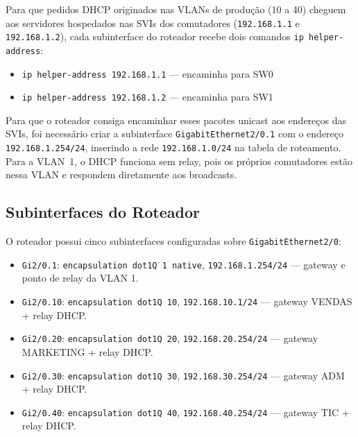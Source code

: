 Para que pedidos DHCP originados nas VLANs de produção (10 a 40) cheguem aos
servidores hospedados nas SVIs dos comutadores (\texttt{192.168.1.1} e
\texttt{192.168.1.2}), cada subinterface do roteador recebe dois comandos
\texttt{ip helper-address}:

\begin{itemize}[leftmargin=2em]
  \item \texttt{ip helper-address 192.168.1.1} --- encaminha para SW0
  \item \texttt{ip helper-address 192.168.1.2} --- encaminha para SW1
\end{itemize}

\begin{sloppypar}
Para que o roteador consiga encaminhar esses pacotes unicast aos endereços das SVIs,
foi necessário criar a subinterface \texttt{GigabitEthernet2/0.1} com o endereço
\texttt{192.168.1.254/24}, inserindo a rede \texttt{192.168.1.0/24} na tabela de
roteamento. Para a VLAN~1, o DHCP funciona sem relay, pois os próprios comutadores
estão nessa VLAN e respondem diretamente aos broadcasts.
\end{sloppypar}

\subsection{Subinterfaces do Roteador}

O roteador possui cinco subinterfaces configuradas sobre \texttt{GigabitEthernet2/0}:

\begin{itemize}[leftmargin=2em]
  \item \texttt{Gi2/0.1}: \texttt{encapsulation dot1Q 1 native},
        \texttt{192.168.1.254/24} --- gateway e ponto de relay da VLAN 1.
  \item \texttt{Gi2/0.10}: \texttt{encapsulation dot1Q 10},
        \texttt{192.168.10.1/24} --- gateway VENDAS + relay DHCP.
  \item \texttt{Gi2/0.20}: \texttt{encapsulation dot1Q 20},
        \texttt{192.168.20.254/24} --- gateway MARKETING + relay DHCP.
  \item \texttt{Gi2/0.30}: \texttt{encapsulation dot1Q 30},
        \texttt{192.168.30.254/24} --- gateway ADM + relay DHCP.
  \item \texttt{Gi2/0.40}: \texttt{encapsulation dot1Q 40},
        \texttt{192.168.40.254/24} --- gateway TIC + relay DHCP.
\end{itemize}


